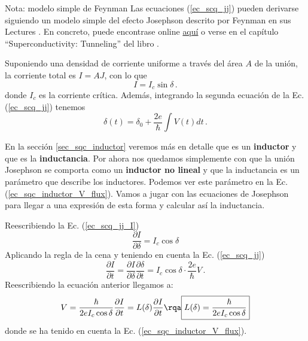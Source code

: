         \begin{mybox_blue}{Nota: modelo simple de Feynman}
        Las ecuaciones (\ref{ec_scq_jj}) pueden derivarse siguiendo un modelo simple del efecto Josephson descrito por Feynman en sus Lectures \cite{bib_scq_Feynman_lectures}. En concreto, puede encontrase online \href{https://www.feynmanlectures.caltech.edu/III_21.html#Ch21-S9}{aquí} o verse en el capítulo ``Superconductivity: Tunneling'' del libro \cite{bib_scq_encyclopedia_of_cmp}.
        \end{mybox_blue}
         
        Suponiendo una densidad de corriente uniforme a través del área $A$ de la unión, la corriente total es $I = AJ$, con lo que
        \begin{equation} \label{ec_scq_jj_I}
        \boxed{I = I_c \sin \delta} \, .
        \end{equation}
        donde $I_c$ es la corriente crítica. Además, integrando la segunda ecuación de la Ec. (\ref{ec_scq_jj}) tenemos
        \begin{equation}
        \boxed{\delta(t) = \delta_0 + \frac{2e}{\hbar} \int V(t)dt} \,.
        \end{equation}







        En la sección \ref{sec_sqc_inductor} veremos más en detalle que es un \textbf{inductor} y que es la \textbf{inductancia}. Por ahora nos quedamos simplemente con que la unión Josephson se comporta como un \textbf{inductor no lineal} y que la inductancia es un parámetro que describe los inductores. Podemos ver este parámetro en la Ec. (\ref{ec_sqc_inductor_V_flux}). Vamos a jugar con las ecuaciones de Josephson para llegar a una expresión de esta forma y calcular así la inductancia.

        Reescribiendo la Ec. (\ref{ec_scq_jj_I})
        \begin{equation}
                \frac{\partial I }{\partial \delta} = I_c \cos \delta 
        \end{equation}
        Aplicando la regla de la cena y teniendo en cuenta la Ec. (\ref{ec_scq_jj})
        \begin{equation}
            \frac{\partial I}{\partial t} = \frac{\partial I}{\partial \delta} \frac{\partial \delta}{\partial t} = I_c \cos \delta \cdot \frac{2e}{\hbar} V \,.
        \end{equation}
        Reescribiendo la ecuación anterior llegamos a:
        \begin{equation}
            V = \frac{\hbar}{2 e I_c \cos \delta}  \frac{\partial I}{\partial t} = L(\delta) \frac{\partial I}{\partial t} 
            \rqa 
            \boxed{L(\delta) = \frac{\hbar}{2 e I_c \cos \delta}} 
        \end{equation}
        donde se ha tenido en cuenta la Ec. (\ref{ec_sqc_inductor_V_flux}).





